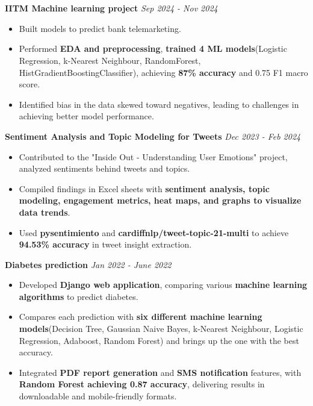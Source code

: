 \documentclass[a4paper,10pt]{article}
\begin{document}
\section{\scshape\color{Fuchsia}{\faLaptopCode\ \textbf PROJECTS}}
\textbf{IITM Machine learning project} \href{https://github.com/ShreehariA/IITM_MLP_Project}{} \hfill \textit{Sep 2024 - Nov 2024}
\vspace{-2mm}
\begin{itemize}
    \item Built models to predict bank telemarketing.
    \vspace{-2mm}
    \item Performed \textbf{EDA and preprocessing}, \textbf{trained 4 ML models}(Logistic Regression, k-Nearest Neighbour, RandomForest, HistGradientBoostingClassifier), achieving \textbf{87\% accuracy} and 0.75 F1 macro score.
    \vspace{-2mm}
    \item Identified bias in the data skewed toward negatives, leading to challenges in achieving better model performance.
\end{itemize}
\textbf{Sentiment Analysis and Topic Modeling for Tweets} \href{https://github.com/ShreehariA/G20_Library_Summit}{} \hfill \textit{Dec 2023 - Feb 2024}
\vspace{-2mm}
\begin{itemize}
    \item Contributed to the "Inside Out - Understanding User Emotions"  project, analyzed sentiments behind tweets and topics.
    \vspace{-2mm}
    \item Compiled findings in Excel sheets with \textbf{sentiment analysis, topic modeling, engagement metrics, heat maps, and graphs to visualize data trends}.
    \vspace{-2mm}
    \item Used \textbf{pysentimiento} and \textbf{cardiffnlp/tweet-topic-21-multi} to achieve \textbf{94.53\% accuracy} in tweet insight extraction.
\end{itemize}
\textbf{Diabetes prediction} \href{https://github.com/ShreehariA/diabetes-pred}{} \hfill \textit{Jan 2022 - June 2022}
\vspace{-2mm}
\begin{itemize}
    \item Developed \textbf{Django web application}, comparing various \textbf{machine learning algorithms} to predict diabetes.
    \vspace{-2mm}
    \item Compares each prediction with \textbf{six different machine learning models}(Decision Tree, Gaussian Naive Bayes, k-Nearest Neighbour, Logistic Regression, Adaboost, Random Forest) and brings up the one with the best accuracy.
    \vspace{-2mm}
    \item Integrated \textbf{PDF report generation} and \textbf{SMS notification} features, with \textbf{Random Forest achieving 0.87 accuracy}, delivering results in downloadable and mobile-friendly formats.
\end{itemize}
\end{document}
